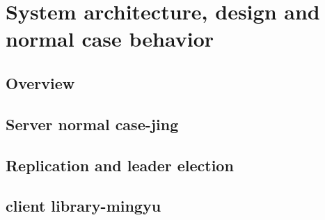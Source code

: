 \section{System architecture, design and normal case behavior}
\subsection{Overview}


\subsection{Server normal case-jing}


\subsection{Replication and leader election}


\subsection{client library-mingyu}
